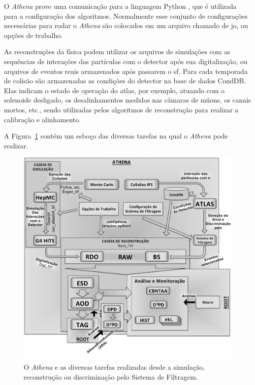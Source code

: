 O \emph{Athena} prove uma comunicação para a
linguagem Python \cite{webPython}, que é utilizada para a configuração dos algoritmos.
Normalmente esse conjunto de configurações necessárias para rodar o \emph{Athena} são 
colocados em um arquivo chamado de \gls{jo}, ou opções de trabalho.

As reconstruções da física podem utilizar os arquivos de simulações com as sequências de
interações das partículas com o detector após sua digitalização, ou arquivos de eventos
reais armazenados após passarem o \glsdesc{sf}. Para cada temporada de
colisão são armazenadas as condições do detector na base de dados CondDB.
Elas indicam o estado de operação do \gls{atlas}, por exemplo, atuando com o
solenoide desligado, os desalinhamentos medidos nas câmaras de múons, os canais
mortos, etc., sendo utilizadas pelos algoritmos de reconstrução 
para realizar a calibração e alinhamento.

A Figura~\ref{fig:cadeia_athena} contém um esboço das diversas tarefas na qual o
\emph{Athena} pode realizar.

\begin{figure}[h!t]
\centering
\includegraphics[width=\textwidth]{imagens/cadeia_athena.pdf}
\caption{O \emph{Athena} e as diversas tarefas realizadas desde a simulação,
reconstrução ou discriminação pelo Sistema de Filtragem.}
\label{fig:cadeia_athena}
\end{figure}

